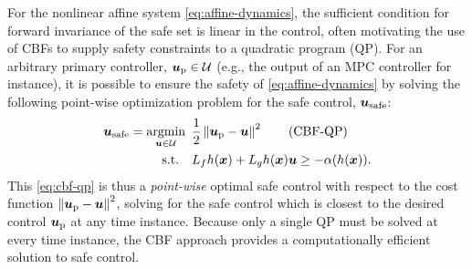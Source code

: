 For the nonlinear affine system \eqref{eq:affine-dynamics}, the sufficient condition for forward invariance of the safe set is linear in the control, often motivating the use of CBFs to supply safety constraints to a quadratic program (QP). For an arbitrary primary controller, $\boldsymbol{u}_{\rm p} \in \mathcal{U}$ (e.g., the output of an MPC controller for instance), it is possible to ensure the safety of \eqref{eq:affine-dynamics} by solving the following point-wise optimization problem for the safe control, $\boldsymbol{u}_{\rm safe}$:
\begin{align} 
    \boldsymbol{u}_{\rm safe} = \underset{\boldsymbol{u} \in \mathcal{U}}{\text{argmin}} \mkern9mu & \frac{1}{2}\left\Vert \boldsymbol{u}_{\rm p}-\boldsymbol{u}\right\Vert^{2}
    \tag{CBF-QP} \label{eq:cbf-qp} \\
    \text{s.t.} \quad & L_f h(\boldsymbol{x}) + L_g h (\boldsymbol{x}) \boldsymbol{u} \ge -\alpha(h(\boldsymbol{x})). \nonumber
\end{align}
This \eqref{eq:cbf-qp} is thus a \textit{point-wise} optimal safe control with respect to the cost function $\left\Vert \boldsymbol{u}_{\rm p}-\boldsymbol{u}\right\Vert^{2}$, solving for the safe control which is closest to the desired control $\boldsymbol{u}_{\rm p}$ at any time instance. Because only a single QP must be solved at every time instance, the CBF approach provides a computationally efficient solution to safe control.

